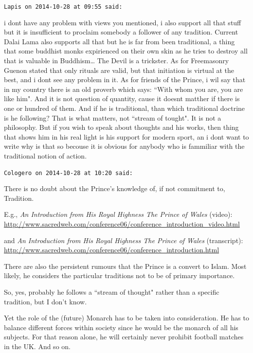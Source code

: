 \begin{footnotesize}
\begin{sffamily}
\hfill

\texttt{Lapis on 2014-10-28 at 09:55 said: }

i dont have any problem with views you mentioned, i also support all that stuff but it is insufficient to proclaim somebody a follower of any tradition. Current Dalai Lama also supports all that but he is far from been traditional, a thing that some buddhist monks expirienced on their own skin as he tries to destroy all that is valuable in Buddhism… The Devil is a trickster. As for Freemasonry Guenon stated that only rituals are valid, but that initiation is virtual at the best, and i dont see any problem in it. As for friends of the Prince, i wil say that in my country there is an old proverb which says: ``With whom you are, you are like him". And it is not question of quantity, cause it doesnt matther if there is one or hundred of them. And if he is traditional, than which traditional doctrine is he following? That is what matters, not ``stream of tought". It is not a philosophy. But if you wish to speak about thoughts and his works, then thing that shows him in his real light is his support for modern sport, an i dont want to write why is that so becouse it is obvious for anybody who is fammiliar with the traditional notion of action.


\hfill

\texttt{Cologero on 2014-10-28 at 10:20 said: }

There is no doubt about the Prince's knowledge of, if not commitment to, Tradition.

E.g., \textit{An Introduction from His Royal Highness The Prince of Wales} (video): \url{http://www.sacredweb.com/conference06/conference_introduction_video.html}

and \textit{An Introduction from His Royal Highness The Prince of Wales} (transcript): \url{http://www.sacredweb.com/conference06/conference_introduction.html}

There are also the persistent rumours that the Prince is a convert to Islam. Most likely, he considers the particular traditions not to be of primary importance.

So, yes, probably he follows a ``stream of thought" rather than a specific tradition, but I don't know.

Yet the role of the (future) Monarch has to be taken into consideration. He has to balance different forces within society since he would be the monarch of all his subjects. For that reason alone, he will certainly never prohibit football matches in the UK. And so on.



\end{sffamily}
\end{footnotesize}
